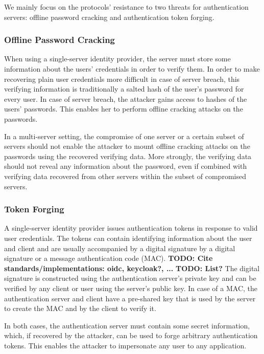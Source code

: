 \documentclass[article]{aaltoseries}
\newcommand{\todo}[1]{}
\renewcommand{\todo}[1]{{\color{red} \textbf{TODO: {#1}}}}
\begin{document}
We mainly focus on the protocols' resistance to two threats for authentication servers: offline password cracking and authentication token forging.

\subsubsection{Offline Password Cracking}

When using a single-server identity provider, the server must store some information about the users' credentials in order to verify them. In order to make recovering plain user credentials more difficult in case of server breach, this verifying information is traditionally a salted hash of the user's password for every user. In case of server breach, the attacker gains access to hashes of the users' passwords. This enables her to perform offline cracking attacks on the passwords.

In a multi-server setting, the compromise of one server or a certain subset of servers should not enable the attacker to mount offline cracking attacks on the passwords using the recovered verifying data. More strongly, the verifying data should not reveal any information about the password, even if combined with verifying data recovered from other servers within the subset of compromised servers.


\subsubsection{Token Forging}

A single-server identity provider issues authentication tokens in response to valid user credentials. The tokens can contain identifying information about the user and client and are usually accompanied by a digital signature by a digital signature or a message authentication code (MAC). \todo{Cite standards/implementations: oidc, keycloak?, ...} \todo{List?} The digital signature is constructed using the authentication server's private key and can be verified by any client or user using the server's public key. In case of a MAC, the authentication server and client have a pre-shared key that is used by the server to create the MAC and by the client to verify it.

In both cases, the authentication server must contain some secret information, which, if recovered by the attacker, can be used to forge arbitrary authentication tokens. This enables the attacker to impersonate any user to any application.
\end{document}
